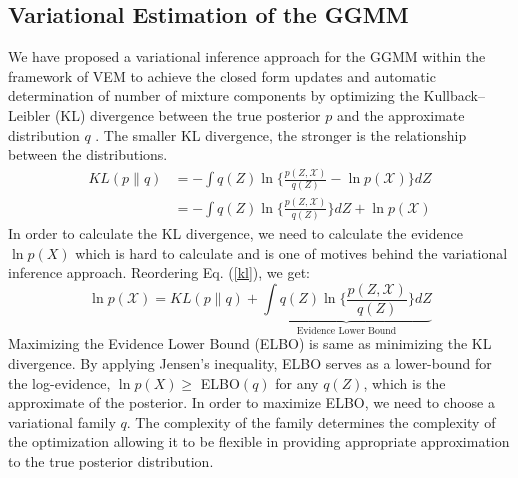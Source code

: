 \documentclass[conference]{IEEEtran}
\begin{document}
\subsection{Variational Estimation of the GGMM}

We have proposed a variational inference approach for the GGMM within the framework of VEM \cite{b10} \cite{Bishop} to achieve the closed form updates and automatic determination of number of mixture components by 
optimizing the Kullback–Leibler (KL) divergence between the true posterior $p$ and the approximate distribution $q$ \cite{Bishop}.
The smaller KL divergence, the stronger is the relationship between the distributions.
\begin{equation}
    \begin{split}\label{kl}
    KL(p\parallel q) & = - \int q(Z) \ln\{\frac{p(Z,\mathcal{X})}{q(Z)}-\ln p(\mathcal{X})\}dZ \\ &
    = - \int q(Z) \ln\{\frac{p(Z,\mathcal{X})}{q(Z)}\}dZ + \ln p(\mathcal{X})
    \end{split}
 \end{equation}
 In order to calculate the KL divergence, we need to calculate the evidence $\ln p(X)$ which is hard to calculate and is one of motives behind the variational inference approach.
 Reordering Eq. (\ref{kl}), we get: 
 \begin{equation}
    \ln p(\mathcal{X}) = KL(p\parallel q) + \underbrace{\int q(Z) \ln\{\frac{p(Z,\mathcal{X})}{q(Z)}\}dZ}_\text{Evidence Lower Bound}
 \end{equation}
Maximizing the Evidence Lower Bound (ELBO) is same as minimizing the KL divergence. 
By applying Jensen's inequality, ELBO serves as a lower-bound for the log-evidence, $\ln p(X) \geq$ ELBO$(q)$ for any $q(Z)$, which is
the approximate of the posterior.  
In order to maximize ELBO, we need to choose a variational family $q$.
The complexity of the family determines the complexity of the optimization allowing it to be flexible in providing appropriate approximation to the true posterior distribution.
\end{document}
